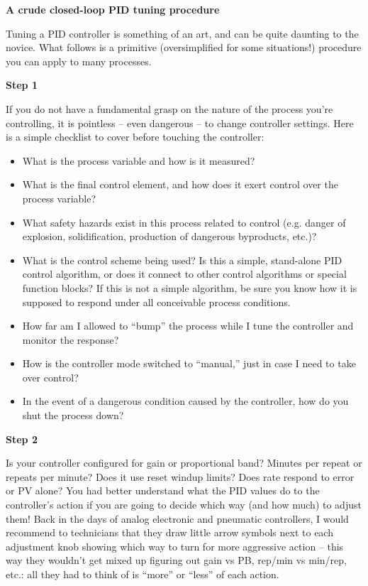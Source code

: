 \vfil \eject

\centerline{\bf A crude closed-loop PID tuning procedure}

\vskip 10pt

Tuning a PID controller is something of an art, and can be quite daunting to the novice.  What follows is a primitive (oversimplified for some situations!) procedure you can apply to many processes.

\vskip 10pt

\noindent
{\bf Step 1}

  If you do not have a fundamental grasp on the nature of the process you're controlling, it is pointless -- even dangerous -- to change controller settings.  Here is a simple checklist to cover before touching the controller:

\begin{itemize}
\item{} What is the process variable and how is it measured?
\item{} What is the final control element, and how does it exert control over the process variable?
\item{} What safety hazards exist in this process related to control (e.g. danger of explosion, solidification, production of dangerous byproducts, etc.)?  
\item{} What is the control scheme being used?  Is this a simple, stand-alone PID control algorithm, or does it connect to other control algorithms or special function blocks?  If this is not a simple algorithm, be sure you know how it is supposed to respond under all conceivable process conditions.
\item{} How far am I allowed to ``bump'' the process while I tune the controller and monitor the response?
\item{} How is the controller mode switched to ``manual,'' just in case I need to take over control?
\item{} In the event of a dangerous condition caused by the controller, how do you shut the process down?
\end{itemize}

\vskip 10pt

\noindent
{\bf Step 2}

  Is your controller configured for gain or proportional band?  Minutes per repeat or repeats per minute?  Does it use reset windup limits?  Does rate respond to error or PV alone?  You had better understand what the PID values do to the controller's action if you are going to decide which way (and how much) to adjust them!  Back in the days of analog electronic and pneumatic controllers, I would recommend to technicians that they draw little arrow symbols next to each adjustment knob showing which way to turn for more aggressive action -- this way they wouldn't get mixed up figuring out gain vs PB, rep/min vs min/rep, etc.: all they had to think of is ``more'' or ``less'' of each action.

